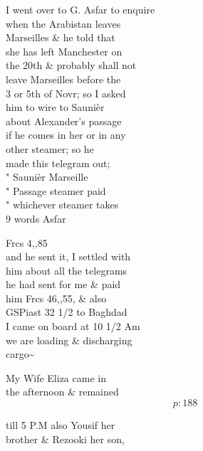 \documentclass{report}
\begin{document}
	\par{
 	I went over to G. Asfar to enquire\ \\when the Arabistan leaves\ \\Marseilles \& he told that\ \\she has left Manchester on\ \\the 20th \& probably shall not\ \\leave Marseilles before the\ \\3 or 5th of Novr; so I asked\ \\him to wire to Saunièr\ \\about Alexander's passage\ \\if he comes in her or in any\ \\other steamer; so he\ \\made this telegram out;\ \\" Saunièr Marseille\ \\" Passage steamer paid\ \\" whichever steamer takes\ \\9 words Asfar\ \\
	}

	\par{
 	Frcs 4,,85\ \\and he sent it, I settled with\ \\him about all the telegrams\ \\he had sent for me \& paid\ \\him Frcs 46,,55, \& also\ \\GSPiast 32 1/2 to Baghdad\ \\I came on board at 10 1/2 Am\ \\we are loading \& discharging\ \\cargo\~{}\ \\
	}

	\par{
 	My Wife Eliza came in\ \\the afternoon \& remained\ \\
  \[p: 188 \]

	}





	\par{
 	till 5 P.M also Yousif her\ \\brother \& Rezooki her son,\ \\
	}
\end{document}
